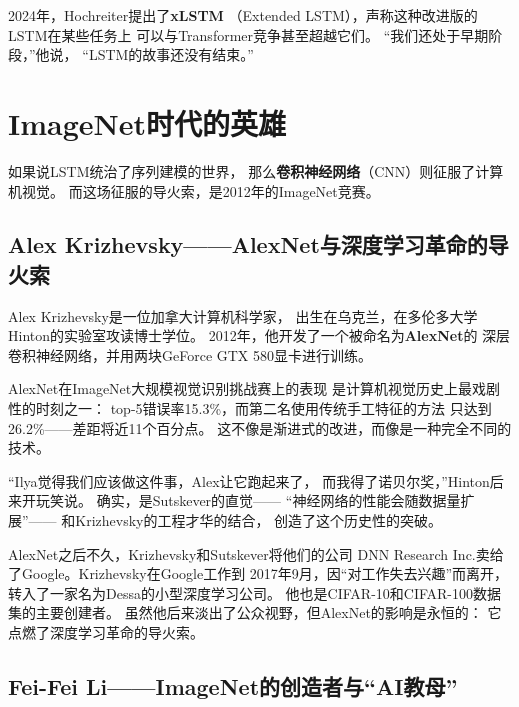 2024年，Hochreiter提出了\textbf{xLSTM}
（Extended LSTM），声称这种改进版的LSTM在某些任务上
可以与Transformer竞争甚至超越它们。
``我们还处于早期阶段，''他说，
``LSTM的故事还没有结束。''


\section{ImageNet时代的英雄}
\label{sec:imagenet-heroes}

如果说LSTM统治了序列建模的世界，
那么\textbf{卷积神经网络}（CNN）则征服了计算机视觉。
而这场征服的导火索，是2012年的ImageNet竞赛。

\subsection{Alex Krizhevsky——AlexNet与深度学习革命的导火索}
\label{sec:krizhevsky}

Alex Krizhevsky是一位加拿大计算机科学家，
出生在乌克兰，在多伦多大学Hinton的实验室攻读博士学位。
2012年，他开发了一个被命名为\textbf{AlexNet}的
深层卷积神经网络，并用两块GeForce GTX 580显卡进行训练。

AlexNet在ImageNet大规模视觉识别挑战赛上的表现
是计算机视觉历史上最戏剧性的时刻之一：
top-5错误率15.3\%，而第二名使用传统手工特征的方法
只达到26.2\%——差距将近11个百分点。
这不像是渐进式的改进，而像是一种完全不同的技术。

``Ilya觉得我们应该做这件事，Alex让它跑起来了，
而我得了诺贝尔奖，''Hinton后来开玩笑说。
确实，是Sutskever的直觉——
``神经网络的性能会随数据量扩展''——
和Krizhevsky的工程才华的结合，
创造了这个历史性的突破。

AlexNet之后不久，Krizhevsky和Sutskever将他们的公司
DNN Research Inc.卖给了Google。Krizhevsky在Google工作到
2017年9月，因``对工作失去兴趣''而离开，
转入了一家名为Dessa的小型深度学习公司。
他也是CIFAR-10和CIFAR-100数据集的主要创建者。
虽然他后来淡出了公众视野，但AlexNet的影响是永恒的：
它点燃了深度学习革命的导火索。

\bigskip

\subsection{Fei-Fei Li——ImageNet的创造者与``AI教母''}
\label{sec:feifei-li}

